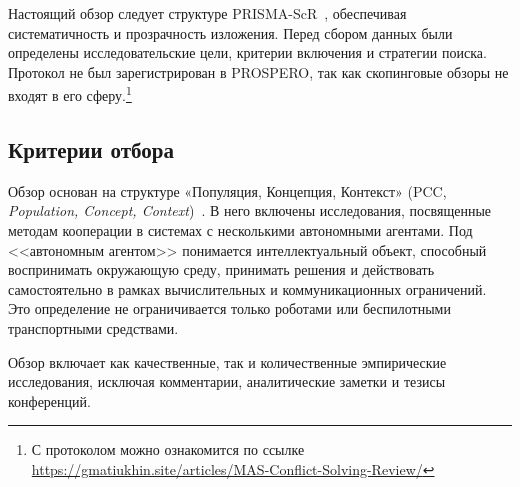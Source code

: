 \documentclass[%
]{ittmm}
\begin{document}
Настоящий обзор следует структуре PRISMA-ScR~\cite{prisma-src},
обеспечивая систематичность и прозрачность изложения.
Перед сбором данных были определены исследовательские цели,
критерии включения и стратегии поиска.
Протокол не был зарегистрирован в PROSPERO,
так как скопинговые обзоры не входят в его сферу.\footnote{С протоколом можно ознакомится по ссылке 
\url{https://gmatiukhin.site/articles/MAS-Conflict-Solving-Review/}}

\subsection{Критерии отбора}

Обзор основан на структуре «Популяция, Концепция, Контекст» (PCC, \textit{Population, Concept, Context})~\cite{afc61c6cf471416489e36a4bc382d3b9}.
В него включены исследования, посвященные методам кооперации в системах с несколькими автономными агентами.
Под <<автономным агентом>> понимается интеллектуальный объект,
способный воспринимать окружающую среду,
принимать решения и действовать самостоятельно в рамках вычислительных и коммуникационных ограничений.
Это определение не ограничивается только роботами или беспилотными транспортными средствами.

Обзор включает как качественные, 
так и количественные эмпирические исследования,
исключая комментарии, аналитические заметки и тезисы конференций.
\end{document}
